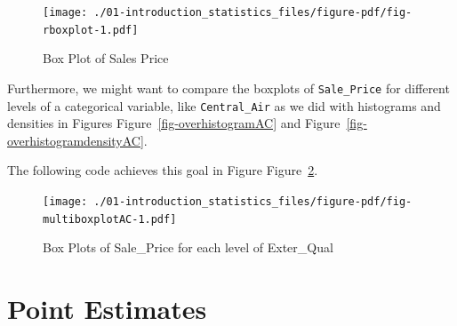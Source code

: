 \documentclass[
  letterpaper,
  DIV=11,
  numbers=noendperiod]{scrreprt}
\newenvironment{Shaded}{\begin{snugshade}}{\end{snugshade}}
\newcommand{\AttributeTok}[1]{\textcolor[rgb]{0.40,0.45,0.13}{#1}}
\newcommand{\DecValTok}[1]{\textcolor[rgb]{0.68,0.00,0.00}{#1}}
\newcommand{\FunctionTok}[1]{\textcolor[rgb]{0.28,0.35,0.67}{#1}}
\newcommand{\NormalTok}[1]{\textcolor[rgb]{0.00,0.23,0.31}{#1}}
\newcommand{\SpecialCharTok}[1]{\textcolor[rgb]{0.37,0.37,0.37}{#1}}
\newcommand{\StringTok}[1]{\textcolor[rgb]{0.13,0.47,0.30}{#1}}
\begin{document}
\begin{figure}[H]

{\centering \texttt{[image: ./01-introduction\_statistics\_files/figure-pdf/fig-rboxplot-1.pdf]}

}

\caption{\label{fig-rboxplot}Box Plot of Sales Price}

\end{figure}

Furthermore, we might want to compare the boxplots of
\texttt{Sale\_Price} for different levels of a categorical variable,
like \texttt{Central\_Air} as we did with histograms and densities in
Figures Figure~\ref{fig-overhistogramAC} and
Figure~\ref{fig-overhistogramdensityAC}.

The following code achieves this goal in Figure
Figure~\ref{fig-multiboxplotAC}.

\begin{Shaded}
\end{Shaded}

\begin{figure}[H]

{\centering \texttt{[image: ./01-introduction\_statistics\_files/figure-pdf/fig-multiboxplotAC-1.pdf]}

}

\caption{\label{fig-multiboxplotAC}Box Plots of Sale\_Price for each
level of Exter\_Qual}

\end{figure}

\hypertarget{pointest}{%
\section{Point Estimates}\label{pointest}}
\end{document}
